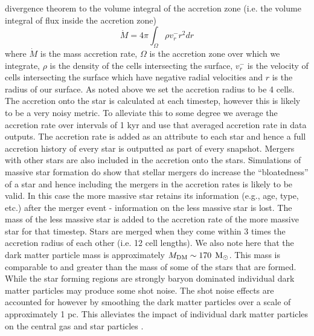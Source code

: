 \documentclass[twocolumn,iop,revtex4]{openjournal}
\newcommand{\msolarc} {$\rm{M_{\odot}}$}
\begin{document}
divergence theorem to the volume integral of the accretion zone \citep[e.g][]{Bleuler_2014}
(i.e. the volume integral of flux inside the accretion zone)
\begin{equation}
  \dot{M} = 4\pi \int_\Omega { \rho v_r^- r^2 dr}
\end{equation}
where $\dot{M}$ is the mass accretion rate, $\Omega$ is the accretion zone over which we integrate,
$\rho$ is the
density of the cells intersecting the surface, $v_r^-$ is the velocity of cells intersecting
the surface which have negative radial velocities and $r$ is the radius of our surface. As noted above we
set the accretion radius to be 4 cells. The accretion onto the star is calculated at each timestep,
however this is likely to be a very noisy metric. To alleviate this to some degree we average
the accretion rate over intervals of 1 kyr and use that averaged accretion rate in data outputs.
The accretion rate is added as an attribute to each star and hence a full
accretion history of every star is outputted as part of every snapshot. Mergers with other stars
are also included in the accretion onto the stars. Simulations of massive star formation
\citep[e.g.][]{Meyer_2020} do show that stellar mergers do increase the “bloatedness” of a star
and hence including the mergers in the accretion rates is likely to be valid.
In this case the more massive star retains its
information (e.g., age, type, etc.) after the merger event - information on the less massive star is
lost. The mass of the less massive star is added to the accretion rate of the more massive star for
that timestep. Stars are merged when they come within 3 times the accretion radius of each other (i.e. 12 cell lengths).
We also note here that the dark matter particle mass is approximately $M_{\rm DM} \sim 170$ \msolarc.
  This mass is comparable to and greater than the mass of some of the stars that are formed. While
  the star forming regions are strongly baryon dominated individual dark matter particles may produce
  some shot noise. The shot noise effects are accounted for however by smoothing the dark matter particles
  over a scale of approximately 1 pc. This alleviates the impact of individual dark matter particles
  on the central gas and star particles \citep[e.g.][]{Regan_2015}. \\
\end{document}
